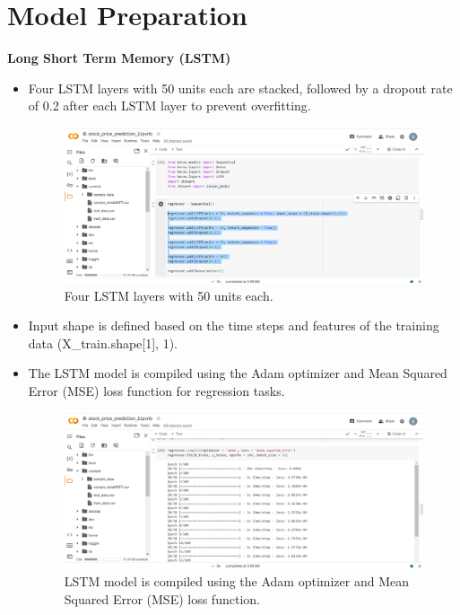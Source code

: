 \documentclass{article}
\begin{document}
\section{Model Preparation}
{\bfseries Long Short Term Memory (LSTM) 
} 

\begin{itemize}
  \item Four LSTM layers with 50 units each are stacked, followed by a dropout rate of 0.2 after each LSTM layer to prevent overfitting.
  \begin{figure}
      \centering
      \includegraphics[width=1\linewidth]{Capture7.PNG}
      \caption{Four LSTM layers with 50 units each.}
      \label{fig:enter-label}
  \end{figure}
\item Input shape is defined based on the time steps and features of the training data (X\_train.shape[1], 1).
\end{itemize}

\begin{itemize}
  \item The LSTM model is compiled using the Adam optimizer and Mean Squared Error
(MSE) loss function for regression tasks.
\begin{figure}
    \centering
    \includegraphics[width=1\linewidth]{Capture8.PNG}
    \caption{LSTM model is compiled using the Adam optimizer and Mean Squared
Error (MSE) loss function.}
    \label{fig:enter-label}
\end{figure}
\end{itemize}
\end{document}
